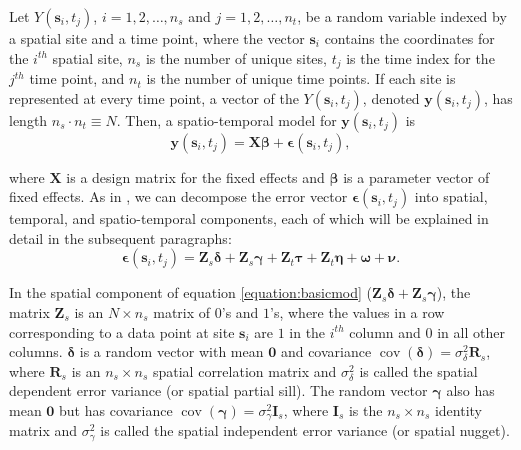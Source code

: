 \documentclass[]{interact}
\theoremstyle{plain}%
\theoremstyle{definition}
\theoremstyle{remark}
\begin{document}
Let \(Y(\mathbf{s}_{i}, t_j)\), \(i = 1, 2, \ldots, n_{s}\) and
\(j = 1, 2, \ldots, n_{t}\), be a random variable indexed by a spatial
site and a time point, where the vector \(\mathbf{s}_i\) contains the
coordinates for the \(i^{th}\) spatial site, \(n_s\) is the number of
unique sites, \(t_j\) is the time index for the \(j^{th}\) time point,
and \(n_t\) is the number of unique time points. If each site is
represented at every time point, a vector of the
\(Y(\mathbf{s}_{i}, t_j)\), denoted \(\mathbf{y}(\mathbf{s}_{i}, t_j)\),
has length \(n_{s} \cdot n_{t} \equiv N\). Then, a spatio-temporal model
for \(\mathbf{y}(\mathbf{s}_{i}, t_j)\) is \mbox{} \begin{equation}
\mathbf{y}(\mathbf{s}_{i}, t_j) = \mathbf{X} \bm{\beta} + \bm{\epsilon}(\mathbf{s}_{i}, t_j),
\end{equation}

\noindent where \(\mathbf{X}\) is a design matrix for the fixed effects
and \(\bm{\beta}\) is a parameter vector of fixed effects. As in
\citet{dumelle2021linear}, we can decompose the error vector
\(\bm{\epsilon}(\mathbf{s}_{i}, t_j)\) into spatial, temporal, and
spatio-temporal components, each of which will be explained in detail in
the subsequent paragraphs: \mbox{}
\begin{equation} \label{equation:basicmod}
\bm{\epsilon}(\mathbf{s}_{i}, t_j) = \mathbf{Z}_{s} \bm{\delta} + \mathbf{Z}_{s} \bm{\gamma} + \mathbf{Z}_t \bm{\tau} + \mathbf{Z}_t \bm{\eta} + \bm{\omega} + \bm{\nu}.
\end{equation}

In the spatial component of equation \ref{equation:basicmod}
(\(\mathbf{Z}_{s} \bm{\delta} + \mathbf{Z}_{s} \bm{\gamma}\)), the
matrix \(\mathbf{Z}_{s}\) is an \(N \times n_s\) matrix of \(0\)'s and
\(1\)'s, where the values in a row corresponding to a data point at site
\(\mathbf{s}_{i}\) are \(1\) in the \(i^{th}\) column and \(0\) in all
other columns. \(\bm{\delta}\) is a random vector with mean
\(\mathbf{0}\) and covariance
\(\mathop{\mathrm{{cov}}}(\bm{\delta}) = \sigma^2_{\delta} \mathbf{R}_{s}\),
where \(\mathbf{R}_s\) is an \(n_s \times n_s\) spatial correlation
matrix and \(\sigma^2_{\delta}\) is called the spatial dependent error
variance (or spatial partial sill). The random vector \(\bm{\gamma}\)
also has mean \(\mathbf{0}\) but has covariance
\(\mathop{\mathrm{{cov}}}(\bm{\gamma}) = \sigma^2_{\gamma} \mathbf{I}_{s}\),
where \(\mathbf{I}_s\) is the \(n_s \times n_s\) identity matrix and
\(\sigma^2_{\gamma}\) is called the spatial independent error variance
(or spatial nugget).
\end{document}

